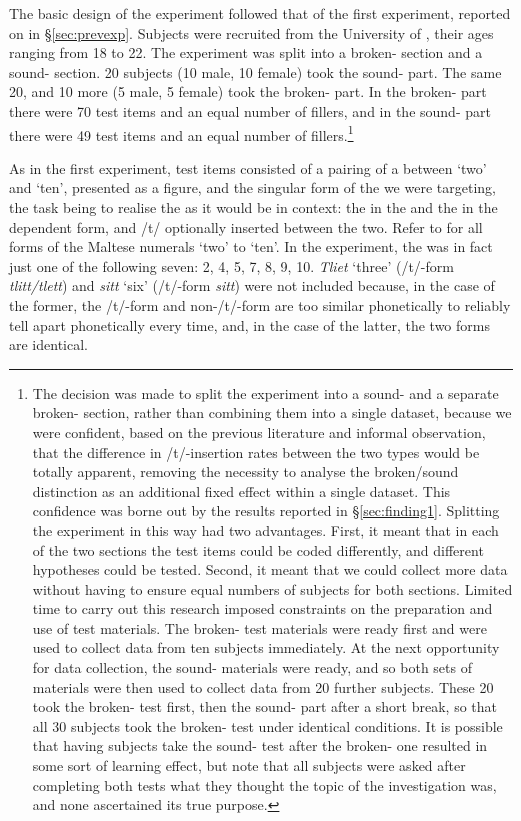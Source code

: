 \documentclass[output=paper]{langsci/langscibook}
\begin{document}
The basic design of the experiment followed that of the first experiment, reported on in §\ref{sec:prevexp}. Subjects were recruited from the University of , their ages ranging from 18 to 22. The experiment was split into a broken- section and a sound- section. 20 subjects (10 male, 10 female) took the sound- part. The same 20, and 10 more (5 male, 5 female) took the broken- part. In the broken- part there were 70 test items and an equal number of fillers, and in the sound- part there were 49 test items and an equal number of fillers.\footnote{The decision was made to split the experiment into a sound- and a separate broken- section, rather than combining them into a single dataset, because we were confident, based on the previous literature and informal observation, that the difference in /t/-insertion rates between the two  types would be totally apparent, removing the necessity to analyse the broken/sound distinction as an additional fixed effect within a single dataset. This confidence was borne out by the results reported in §\ref{sec:finding1}. Splitting the experiment in this way had two advantages. First, it meant that in each of the two sections the test items could be coded differently, and different hypotheses could be tested. Second, it meant that we could collect more data without having to ensure equal numbers of subjects for both sections. Limited time to carry out this research imposed constraints on the preparation and use of test materials. The broken- test materials were ready first and were used to collect data from ten subjects immediately. At the next opportunity for data collection, the sound- materials were ready, and so both sets of materials were then used to collect data from 20 further subjects. These 20 took the broken- test first, then the sound- part after a short break, so that all 30 subjects took the broken- test under identical conditions. It is possible that having subjects take the sound- test after the broken- one resulted in some sort of learning effect, but note that all subjects were asked after completing both tests what they thought the topic of the investigation was, and none ascertained its true purpose.} 

As in the first experiment, test items consisted of a pairing of a  between ‘two’ and ‘ten’, presented as a figure, and the singular form of the  we were targeting, the task being to realise the  as it would be in context: the  in the  and the  in the dependent form, and /t/ optionally inserted between the two. Refer to  for all forms of the Maltese numerals ‘two’ to ‘ten’. In the experiment, the  was in fact just one of the following seven: 2, 4, 5, 7, 8, 9, 10. \textit{Tliet} ‘three’ (/t/-form \textit{tlitt/tlett}) and \textit{sitt} ‘six’ (/t/-form \textit{sitt}) were not included because, in the case of the former, the /t/-form and non-/t/-form are too similar phonetically to reliably tell apart phonetically every time, and, in the case of the latter, the two forms are identical. 
\end{document}
